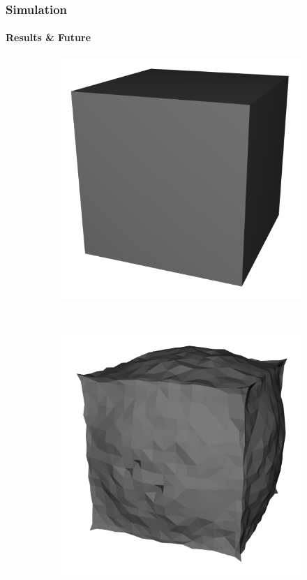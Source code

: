 \documentclass[12pt,t]{beamer}
\begin{document}
\begin{frame}
    \frametitle{Simulation}
    \framesubtitle{Results \& Future}

\begin{figure}
        \centering
        \begin{subfigure}[t]{0.3\textwidth}
                \includegraphics[width=\textwidth]{img/maya0.png}
        \end{subfigure}%
        ~ %
        \begin{subfigure}[t]{0.3\textwidth}
                \includegraphics[width=\textwidth]{img/maya1.png}
        \end{subfigure}


\end{figure}
\end{frame}
\end{document}
